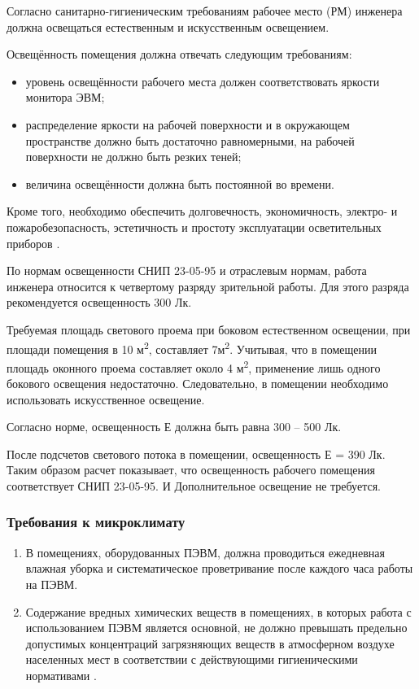 Согласно санитарно-гигиеническим требованиям рабочее место (РМ) инженера должна освещаться естественным и искусственным освещением.

Освещённость помещения должна отвечать следующим требованиям\cite{OT9}:

\begin{itemize}
 \item уровень освещённости рабочего места должен соответствовать яркости монитора ЭВМ;
 \item распределение яркости на рабочей поверхности и в окружающем пространстве должно быть достаточно равномерными, на рабочей поверхности не должно быть резких теней;
 \item величина освещённости должна быть постоянной во времени.
\end{itemize}

Кроме того, необходимо обеспечить долговечность, экономичность, электро- и пожаробезопасность, эстетичность и простоту эксплуатации осветительных приборов\cite{OT8} .

По нормам освещенности СНИП 23-05-95\cite{OT6} и отраслевым нормам, работа инженера относится к четвертому разряду зрительной работы. Для этого разряда рекомендуется освещенность 300 Лк. 

Требуемая площадь светового проема при боковом естественном освещении, при площади помещения в 10 м\textsuperscript{2}, составляет 7м\textsuperscript{2}. Учитывая, что в помещении площадь оконного проема составляет около 4 м\textsuperscript{2}, применение лишь одного бокового освещения недостаточно. Следовательно, в помещении необходимо использовать искусственное освещение. 

Согласно норме, освещенность Е должна быть равна 300 – 500 Лк. 

После подсчетов светового потока в помещении, освещенность Е = 390 Лк. Таким образом расчет показывает, что освещенность рабочего помещения соответствует СНИП 23-05-95. И Дополнительное освещение не требуется.

\subsubsection{Требования к микроклимату}

\begin{enumerate}
 \item В помещениях, оборудованных ПЭВМ, должна проводиться ежедневная влажная уборка и систематическое проветривание после каждого часа работы на ПЭВМ.
 \item Содержание вредных химических веществ в помещениях, в которых работа с использованием ПЭВМ является основной, не должно превышать предельно допустимых концентраций загрязняющих веществ в атмосферном воздухе населенных мест в соответствии с действующими гигиеническими нормативами \cite{OT2}.
\end{enumerate}

